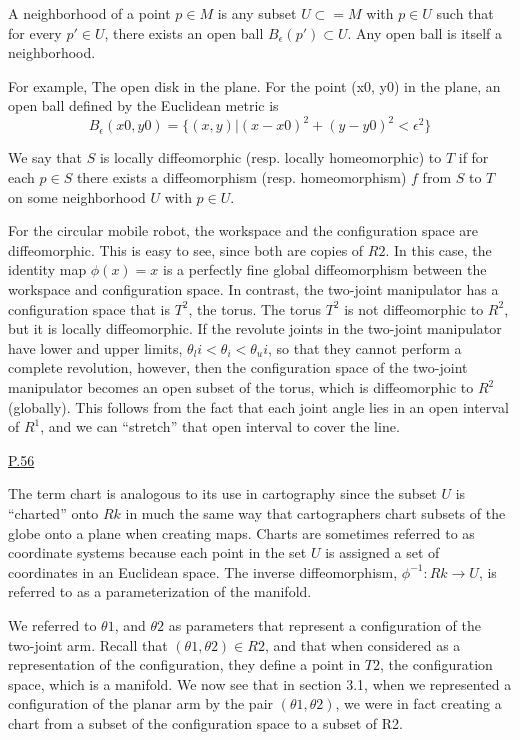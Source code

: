 A neighborhood of a point $p \in M$ is any subset $U \subset= M$
with $p \in U$ such that for every $p' \in U$, there exists an open ball $B_\epsilon(p') \subset U$. Any open ball is itself a neighborhood.

For example, The open disk in the plane. For the
point (x0, y0) in the plane, an open ball defined by the Euclidean metric is
\begin{equation}
    B_\epsilon(x0,y0) = \{(x,y) | (x-x0)^2 + (y-y0)^2 < \epsilon^2\}
\end{equation}

We say that $S$ is locally diffeomorphic (resp. locally homeomorphic) to $T$ if for each $p \in S$ there exists a diffeomorphism (resp. homeomorphism) $f$ from $S$ to $T$ on some neighborhood $U$ with $p \in U$.

For the circular mobile robot, the workspace and the configuration space are diffeomorphic. This is easy to see, since both are copies of $R2$.
In this case, the identity map $\phi(x) = x$ is a perfectly fine global diffeomorphism between the workspace and configuration space.
In contrast, the two-joint manipulator has a configuration space that is $T^2$, the torus.
The torus $T^2$ is not diffeomorphic to $R^2$, but it is locally diffeomorphic.
If the revolute joints in the two-joint manipulator have lower and upper limits, $\theta_li < \theta_i < \theta_ui$, so that they cannot perform a complete revolution, however, then the configuration space of the two-joint manipulator becomes an open subset of the torus, which is diffeomorphic to $R^2$ (globally).
This follows from the fact that each joint angle lies in an open interval of $R^1$, and we can “stretch” that open interval to cover the line.

\noindent \underline{P.56}

The term chart is analogous to its use in cartography since the subset $U$ is “charted” onto $Rk$ in much the same way that cartographers chart subsets of the globe onto a plane when creating maps. Charts are sometimes referred to as coordinate systems because each point in the set $U$ is assigned a set of coordinates in an Euclidean space. The inverse diffeomorphism, $ \phi^{-1}: Rk \rightarrow U$, is referred to as a parameterization of the manifold.

We referred to $\theta1$, and $\theta2$ as parameters that represent a configuration of the two-joint arm. Recall that $(\theta1, \theta2) \in R2$, and that when considered as a representation of the configuration, they define a point in $T2$, the configuration space, which is a manifold. We now see that in section 3.1, when we represented a configuration of the planar arm by the pair $(\theta1, \theta2)$, we were in fact creating a chart from a subset of the configuration space to a subset of R2.

